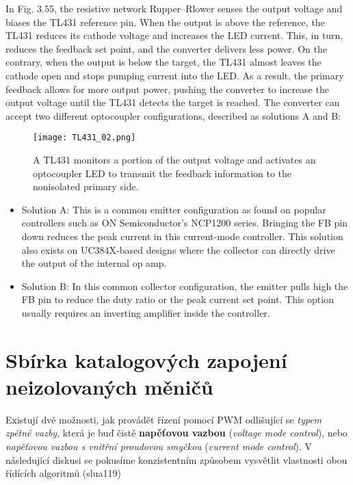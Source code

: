       In Fig. 3.55, the resistive network Rupper–Rlower senses the output voltage and biases the 
      TL431 reference pin. When the output is above the reference, the TL431 reduces its cathode 
      voltage and increases the LED current. This, in turn, reduces the feedback set point, and the 
      converter delivers less power. On the contrary, when the output is below the target, the 
      TL431 almost leaves the cathode open and stops pumping current into the LED. As a result, the 
      primary feedback allows for more output power, pushing the converter to increase the output 
      voltage until the TL431 detects the target is reached. The converter can accept two different 
      optocoupler configurations, described as solutions A and B:
      
      \begin{figure}[ht!]
        \centering
        \texttt{[image: TL431\_02.png]}
        \caption{A TL431 monitors a portion of the output voltage and activates an optocoupler LED 
                 to transmit the feedback information to the nonisolated primary side. 
                 \cite[s.~43]{Basso2008}}
        \label{enz:fig_tl431_02}
      \end{figure}
       
      \begin{itemize}\addtolength{\itemsep}{-0.5\baselineskip}
        \item Solution A: This is a common emitter configuration as found on popular controllers 
              such as ON Semiconductor’s NCP1200 series. Bringing the FB pin down reduces the peak 
              current in this current-mode controller. This solution also exists on UC384X-based 
              designs where the collector can directly drive the output of the internal op amp.
        \item Solution B: In this common collector configuration, the emitter pulls high the FB pin 
              to reduce the duty ratio or the peak current set point. This option usually requires 
              an inverting amplifier inside the controller.
      \end{itemize}
    

  \section{Sbírka katalogových zapojení neizolo\-va\-ných měničů}\label{aes:sec009}
    Existují dvě možnosti, jak provádět řízení pomocí PWM odlišující se \emph{typem zpětné
    vazby}, která je buď čistě \textbf{napěťovou vazbou} (\emph{voltage mode control}), nebo
    \emph{napěťovou vazbou s vnitřní proudovou smyčkou} (\emph{current mode control}). V
    následující diskusi se pokusíme konzistentním způsobem vysvětlit vlastnosti obou řídících
    algoritmů (slua119)
    
